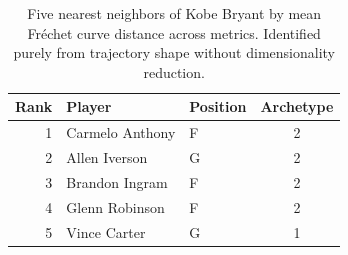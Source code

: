 \begin{table}[htbp]
  \centering\small
  \begin{tabular}{rllc}
    \toprule
    Rank & Player & Position & Archetype \\
    \midrule
    1 & Carmelo Anthony & F & 2 \\
    2 & Allen Iverson & G & 2 \\
    3 & Brandon Ingram & F & 2 \\
    4 & Glenn Robinson & F & 2 \\
    5 & Vince Carter & G & 1 \\
    \bottomrule
  \end{tabular}
  \caption{Five nearest neighbors of Kobe Bryant by mean Fr\'{e}chet curve distance across metrics. Identified purely from trajectory shape without dimensionality reduction.}
  \label{tab:Kobe_Bryant_frechet_curve_neighbors}
\end{table}

